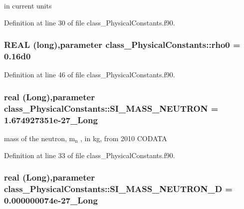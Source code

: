 in current units 



Definition at line 30 of file class\_\-PhysicalConstants.f90.

\hypertarget{namespaceclass__PhysicalConstants_afd1e8c949a1607aa74c06b2cf93718a8}{
\subsubsection[{rho0}]{\setlength{\rightskip}{0pt plus 5cm}REAL (long),parameter {\bf class\_\-PhysicalConstants::rho0} = 0.16d0}}
\label{namespaceclass__PhysicalConstants_afd1e8c949a1607aa74c06b2cf93718a8}


Definition at line 46 of file class\_\-PhysicalConstants.f90.

\hypertarget{namespaceclass__PhysicalConstants_ae630d55c57af72ecd1cf1b926512f9e4}{
\subsubsection[{SI\_\-MASS\_\-NEUTRON}]{\setlength{\rightskip}{0pt plus 5cm}real (Long),parameter {\bf class\_\-PhysicalConstants::SI\_\-MASS\_\-NEUTRON} = 1.674927351e-\/27\_\-Long}}
\label{namespaceclass__PhysicalConstants_ae630d55c57af72ecd1cf1b926512f9e4}


mass of the neutron, m$_{\mbox{n}}$ , in kg, from 2010 CODATA 



Definition at line 33 of file class\_\-PhysicalConstants.f90.

\hypertarget{namespaceclass__PhysicalConstants_a2a2b96dae5b376e21555324d6f18d7b4}{
\subsubsection[{SI\_\-MASS\_\-NEUTRON\_\-D}]{\setlength{\rightskip}{0pt plus 5cm}real (Long),parameter {\bf class\_\-PhysicalConstants::SI\_\-MASS\_\-NEUTRON\_\-D} = 0.000000074e-\/27\_\-Long}}
\label{namespaceclass__PhysicalConstants_a2a2b96dae5b376e21555324d6f18d7b4}


